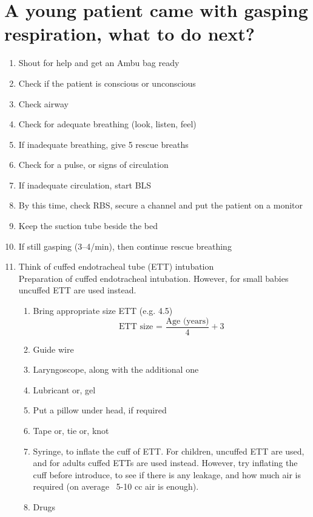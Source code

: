 \documentclass[11pt,a4paper]{report}
\begin{document}
\section{A young patient came with gasping respiration, what to do next?}
\begin{enumerate}
	\item Shout for help and get an Ambu bag ready
	\item Check if the patient is conscious or unconscious
	\item Check airway 
	\item Check for adequate breathing (look, listen, feel)
	\item If inadequate breathing, give 5 rescue breaths 
	\item Check for a pulse, or signs of circulation 
	\item If inadequate circulation, start BLS
	\item By this time, check RBS, secure a channel and put the patient on a monitor
	\item Keep the suction tube beside the bed
	\item If still gasping (3--4/min), then continue rescue breathing
	\item Think of cuffed endotracheal tube (ETT) intubation \\
	Preparation of cuffed endotracheal intubation. However, for small babies uncuffed ETT are used instead. 
	\begin{enumerate}
		\item Bring appropriate size ETT (e.g. 4.5) 
		\begin{equation}
		\text{ETT size = }
		\frac
		{\text{Age (years)}}{4}
		+ 3
		\end{equation}
		\item Guide wire
		\item Laryngoscope, along with the additional one
		\item Lubricant or, gel
		\item Put a pillow under head, if required 
		\item Tape or, tie or, knot 
		\item Syringe, to inflate the cuff of ETT. For children, uncuffed ETT are used, and for adults cuffed ETTs are used instead. However, try inflating the cuff before introduce, to see if there is any leakage, and how much air is required (on average ~5-10 cc air is enough). 
		\item Drugs 
		\begin{enumerate}

\end{enumerate}
\end{enumerate}
\end{enumerate}
\end{document}

